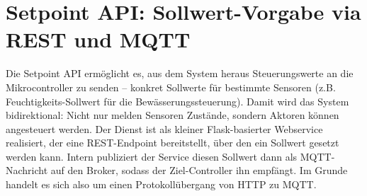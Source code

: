 \section{Setpoint API: Sollwert-Vorgabe via REST und MQTT}
Die Setpoint API ermöglicht es, aus dem System heraus Steuerungswerte an die Mikrocontroller zu senden – konkret Sollwerte für bestimmte Sensoren (z.B. Feuchtigkeits-Sollwert für die Bewässerungssteuerung). Damit wird das System bidirektional: Nicht nur melden Sensoren Zustände, sondern Aktoren können angesteuert werden. Der Dienst ist als kleiner Flask-basierter Webservice realisiert, der eine REST-Endpoint bereitstellt, über den ein Sollwert gesetzt werden kann. Intern publiziert der Service diesen Sollwert dann als MQTT-Nachricht auf den Broker, sodass der Ziel-Controller ihn empfängt. Im Grunde handelt es sich also um einen Protokollübergang von HTTP zu MQTT.
